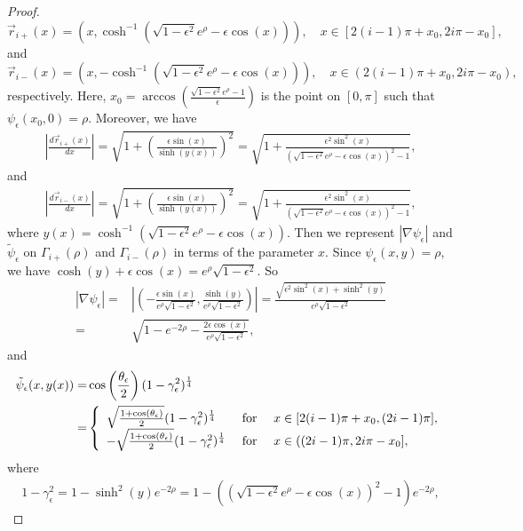 \documentclass[1 [leqno, 11pt]{amsart}
\numberwithin{equation}{section}
\let\ep=\epsilon
\def\gep{\gamma_\epsilon}
\begin{document}
\begin{CJK*}{GBK}{song}
\begin{proof}
$$\vec{r}_{i+} (x) = (x, \cosh^{-1}(\sqrt{1-\ep^2} e^{\rho} - \ep \cos(x))), \quad x \in [2(i-1)\pi + x_0, 2i\pi - x_0], $$
and
$$\vec{r}_{i-} (x) = (x, -\cosh^{-1}(\sqrt{1-\ep^2} e^{\rho} - \ep \cos(x))), \quad x \in (2(i-1)\pi + x_0, 2i\pi - x_0), $$
respectively. Here, $x_0 = \arccos\left( \frac{\sqrt{1-\ep^2} e^\rho - 1}{\ep} \right) $ is the point on $[0, \pi]$ such that $\psi_\ep(x_0,0)=\rho$.
Moreover, we have
\begin{align}\label{dr+}
\left|\frac{d \vec{r}_{i+}(x)}{dx}\right| = \sqrt{ 1 + \left(\frac{\ep \sin(x)}{\sinh(y(x))}\right)^2} = \sqrt{ 1 + \frac{\ep^2 \sin^2(x)}{ ( \sqrt{1-\ep^2} e^{\rho} - \ep \cos(x) )^2 - 1 }},
\end{align}
and
\begin{align}\label{dr-}
\left|\frac{d \vec{r}_{i-}(x)}{dx}\right|  = \sqrt{ 1 + \left(\frac{\ep \sin(x)}{\sinh(y(x))}\right)^2} = \sqrt{ 1 + \frac{\ep^2 \sin^2(x)}{ ( \sqrt{1-\ep^2} e^{\rho} - \ep \cos(x) )^2 - 1 }},\end{align}
where $y(x)=\cosh^{-1}(\sqrt{1-\ep^2} e^{\rho} - \ep \cos(x))$.
Then we  represent $\left| \nabla \psi_\ep \right| $ and $\tilde{\psi}_\ep$ on $\Gamma_{i+}(\rho)$ and $\Gamma_{i-}(\rho)$ in terms of the parameter $x$. Since
$\psi_\ep(x,y) = \rho$, we have $\cosh(y) + \ep \cos(x) = e^\rho \sqrt{1-\ep^2}$. So
\begin{align}\label{tilde psi-p-x}
\left| \nabla \psi_\ep \right|
= & \left| \left( - \frac{\ep \sin(x)}{e^\rho \sqrt{1-\ep^2}}, \frac{\sinh(y)}{e^\rho \sqrt{1-\ep^2}} \right) \right|
=  \frac{\sqrt{\ep^2 \sin^2(x) + \sinh^2(y)}}{e^\rho \sqrt{1-\ep^2}} \\\nonumber
=&  \sqrt{1-e^{-2\rho} - \frac{2\ep \cos(x)}{e^\rho \sqrt{1-\ep^2}}},
\end{align}
and
\begin{align}\label{psi-p-x}
\tilde{\psi}_\ep(x,y(x)) =& \cos\left(\frac{\theta_\ep}{2}\right)(1-\gep^2)^{1\over4} \\\nonumber
=& \left\{ \begin{array}{lll} \sqrt{\frac{1+\cos(\theta_\ep)}{2}} (1-\gep^2)^{1\over4} &\mbox{ for } & x \in [2(i-1)\pi + x_0, (2i - 1)\pi ],\\
 -\sqrt{\frac{1+\cos(\theta_\ep)}{2}} (1-\gep^2)^{1\over4} &\mbox{ for } & x \in ((2i - 1)\pi, 2i\pi - x_0],
 \end{array} \right.
\end{align}
where
\begin{align}\label{psi-p-x1}
1 - \gep^2 = 1 - \sinh^2(y)e^{-2\rho} = 1 - \left(\left( \sqrt{1-\ep^2} e^{\rho} - \ep \cos(x) \right)^2 - 1\right) e^{-2\rho},

\end{align}
\end{proof}
\end{CJK*}
\end{document}
